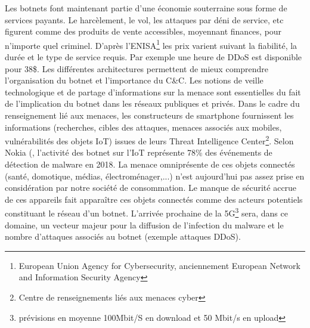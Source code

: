 Les botnets font maintenant partie d'une économie souterraine sous forme de services payants.
Le harcèlement, le vol, les attaques par déni de service, etc figurent comme des produits de vente accessibles, moyennant finances, pour n'importe quel criminel.
\newline D'après l'ENISA\footnote{European Union Agency for Cybersecurity, anciennement European Network and Information Security Agency} les prix varient suivant la fiabilité, la durée et le type de service requis.
Par exemple une heure de DDoS est disponible pour 38\$.
Les différentes architectures permettent de mieux comprendre l'organisation du botnet et l'importance du C\&C.
\vspace{5mm}
\newline Les notions de veille technologique et de partage d'informations sur la menace sont essentielles du fait de l'implication du botnet dans les réseaux publiques et privés.
\newline Dans le cadre du renseignement lié aux menaces, les constructeurs de smartphone fournissent les informations (recherches, cibles des attaques, menaces associés aux mobiles, vulnérabilités des objets IoT) issues de leurs Threat Intelligence Center\footnote{Centre de renseignements liés aux menaces cyber}.
\vspace{5mm}
\newline Selon Nokia (, l'activité des botnet sur l'IoT représente 78\% des événements de détection de malware en 2018.
\newline La menace omniprésente de ces objets connectés (santé, domotique, médias, électroménager,...) n'est aujourd'hui pas assez prise en considération par notre société de consommation.
Le manque de sécurité accrue de ces appareils fait apparaître ces objets connectés comme des acteurs potentiels constituant le réseau d'un botnet.
\newline L'arrivée prochaine de la 5G\footnote{prévisions en moyenne 100Mbit/S en download et 50 Mbit/s en upload} sera, dans ce domaine, un vecteur majeur pour la diffusion de l'infection du malware et le nombre d'attaques associés au botnet (exemple attaques DDoS).


